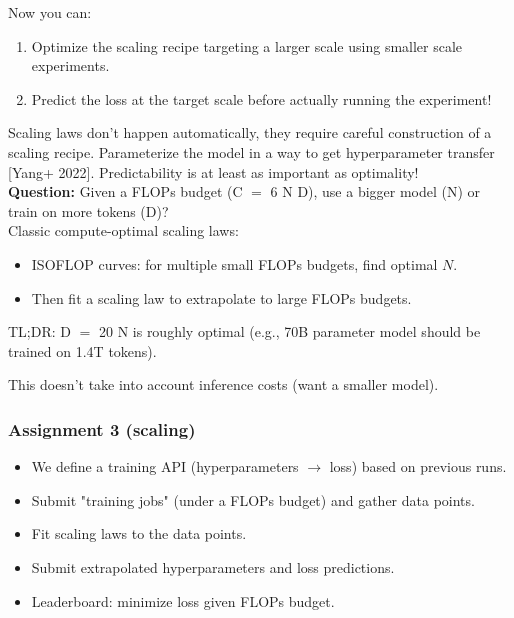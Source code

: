 \documentclass[12pt,twoside]{article}
\begin{document}
Now you can:

\begin{enumerate}
    \item Optimize the scaling recipe targeting a larger scale using smaller scale experiments.
    \item Predict the loss at the target scale before actually running the experiment!
\end{enumerate}

Scaling laws don't happen automatically, they require careful construction of a scaling recipe. Parameterize the model in a way to get hyperparameter transfer [Yang+ 2022]. Predictability is at least as important as optimality! \\

\textbf{Question:} Given a FLOPs budget (C \(=\) 6 N D), use a bigger model (N) or train on more tokens (D)? \\

Classic compute-optimal scaling laws:

\begin{itemize}
    \item ISOFLOP curves: for multiple small FLOPs budgets, find optimal \(N\).
    \item Then fit a scaling law to extrapolate to large FLOPs budgets.
\end{itemize}

TL;DR: D \(=\) 20 N is roughly optimal (e.g., 70B parameter model should be trained on 1.4T tokens).

\begin{remark}
    This doesn't take into account inference costs (want a smaller model).
\end{remark}

\subsubsection*{Assignment 3 (scaling)}

\begin{itemize}
    \item We define a training API (hyperparameters \(\to\) loss) based on previous runs.
    \item Submit "training jobs" (under a FLOPs budget) and gather data points.
    \item Fit scaling laws to the data points.
    \item Submit extrapolated hyperparameters and loss predictions.
    \item Leaderboard: minimize loss given FLOPs budget.
\end{itemize}
\end{document}
